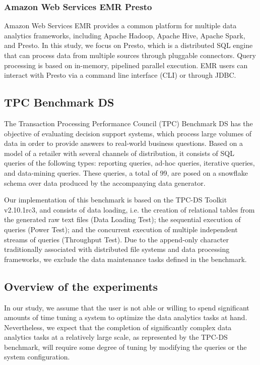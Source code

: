 \subsubsection{Amazon Web Services EMR Presto}
Amazon Web Services EMR provides a common platform for multiple data analytics frameworks, including Apache Hadoop, Apache Hive, Apache Spark, and Presto. In this study, we focus on Presto, which is a distributed SQL engine that can process data from multiple sources through pluggable connectors. Query processing is based on in-memory, pipelined parallel execution. EMR users can interact with Presto via a command line interface (CLI) or through JDBC.

\subsection{TPC Benchmark DS}
The Transaction Processing Performance Council (TPC) Benchmark DS \cite{tpcdsSpec} has the objective of evaluating decision support systems, which process large volumes of data in order to provide answers to real-world business questions. Based on a model of a retailer with several channels of distribution, it consists of SQL queries of the following types: reporting queries, ad-hoc queries, iterative queries, and data-mining queries. These queries, a total of 99, are posed on a snowflake schema over data produced by the accompanying data generator.

Our implementation of this benchmark is based on the TPC-DS Toolkit v2.10.1rc3, and consists of data loading, i.e. the creation of relational tables from the generated raw text files (Data Loading Test); the sequential execution of queries (Power Test); and the concurrent execution of multiple independent streams of queries (Throughput Test). Due to the append-only character traditionally associated with distributed file systems and data processing frameworks, we exclude the data maintenance tasks defined in the benchmark.

\subsection{Overview of the experiments}
In our study, we assume that the user is not able or willing to spend significant amounts of time tuning a system to optimize the data analytics tasks at hand. Nevertheless, we expect that the completion of significantly complex data analytics tasks at a relatively large scale, as represented by the TPC-DS benchmark, will require some degree of tuning by modifying the queries or the system configuration.

